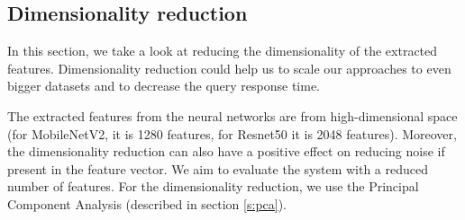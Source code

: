 


\subsection{Dimensionality reduction}

In this section, we take a look at reducing the dimensionality of the extracted features. Dimensionality reduction could help us to scale our approaches to even bigger datasets and to decrease the query response time.

The extracted features from the neural networks are from high-dimensional space (for MobileNetV2, it is 1280 features, for Resnet50 it is 2048 features). Moreover, the dimensionality reduction can also have a positive effect on reducing noise if present in the feature vector. We aim to evaluate the system with a reduced number of features. For the dimensionality reduction, we use the Principal Component Analysis (described in section \ref{s:pca}).


